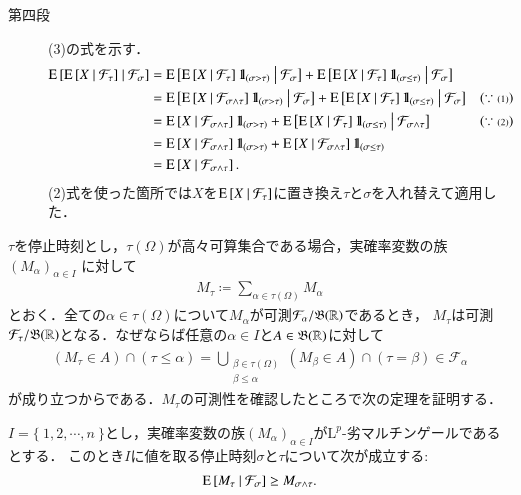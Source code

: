 \begin{prf}
\begin{description}
			\item[第四段]
				(3)の式を示す．
				\begin{align}
					\operatorname{E} \left[ \operatorname{E} \left[ X \ \middle|\ \mathcal{F}_\tau \right] \ \middle|\ \mathcal{F}_\sigma \right]
					&= \operatorname{E} \left[ \operatorname{E} \left[ X \ \middle|\ \mathcal{F}_\tau \right]\mbox{1}\hspace{-0.25em}\mbox{l}_{(\sigma > \tau)} \ \middle|\ \mathcal{F}_\sigma \right]
						+ \operatorname{E} \left[ \operatorname{E} \left[ X \ \middle|\ \mathcal{F}_\tau \right]\mbox{1}\hspace{-0.25em}\mbox{l}_{(\sigma \leq \tau)} \ \middle|\ \mathcal{F}_\sigma \right] \\
					&= \operatorname{E} \left[ \operatorname{E} \left[ X \ \middle|\ \mathcal{F}_{\sigma \wedge \tau} \right]\mbox{1}\hspace{-0.25em}\mbox{l}_{(\sigma > \tau)} \ \middle|\ \mathcal{F}_\sigma \right]
						+ \operatorname{E} \left[ \operatorname{E} \left[ X \ \middle|\ \mathcal{F}_\tau \right]\mbox{1}\hspace{-0.25em}\mbox{l}_{(\sigma \leq \tau)} \ \middle|\ \mathcal{F}_\sigma \right] && (\scriptsize\because\mbox{(1)}) \\
					&= \operatorname{E} \left[ X \ \middle|\ \mathcal{F}_{\sigma \wedge \tau} \right]\mbox{1}\hspace{-0.25em}\mbox{l}_{(\sigma > \tau)}
						+ \operatorname{E} \left[ \operatorname{E} \left[ X \ \middle|\ \mathcal{F}_\tau \right]\mbox{1}\hspace{-0.25em}\mbox{l}_{(\sigma \leq \tau)} \ \middle|\ \mathcal{F}_{\sigma \wedge \tau} \right] && (\scriptsize\because\mbox{(2)}) \\
					&= \operatorname{E} \left[ X \ \middle|\ \mathcal{F}_{\sigma \wedge \tau} \right]\mbox{1}\hspace{-0.25em}\mbox{l}_{(\sigma > \tau)} + \operatorname{E} \left[ X \ \middle|\ \mathcal{F}_{\sigma \wedge \tau} \right]\mbox{1}\hspace{-0.25em}\mbox{l}_{(\sigma \leq \tau)} \\
					&= \operatorname{E} \left[ X \ \middle|\ \mathcal{F}_{\sigma \wedge \tau} \right].
				\end{align}
				(2)式を使った箇所では$X$を$\operatorname{E} \left[ X \ \middle|\ \mathcal{F}_\tau \right]$に置き換え$\tau$と$\sigma$を入れ替えて適用した．
		\end{description}
		\QED
	\end{prf}
	
	$\tau$を停止時刻とし，$\tau(\Omega)$が高々可算集合である場合，実確率変数の族$(M_\alpha)_{\alpha \in I}$
	に対して
	\begin{align}
		M_\tau \coloneqq \sum_{\alpha \in \tau(\Omega)}M_\alpha
	\end{align}
	とおく．全ての$\alpha \in \tau(\Omega)$について$M_\alpha$が可測$\mathcal{F}_\alpha/\mathfrak{B}(\mathbb{R})$であるとき，
	$M_\tau$は可測$\mathcal{F}_\tau/\mathfrak{B}(\mathbb{R})$となる．なぜならば任意の$\alpha \in I$と$A \in \mathfrak{B}(\mathbb{R})$に対して
	\begin{align}
		(M_\tau \in A) \cap (\tau \leq \alpha)
		= \bigcup_{\substack{\beta \in \tau(\Omega) \\ \beta \leq \alpha}}(M_\beta \in A) \cap (\tau = \beta) \in \mathcal{F}_\alpha 
	\end{align}
	が成り立つからである．$M_\tau$の可測性を確認したところで次の定理を証明する．
	
	\begin{itembox}[l]{}
		\begin{thm}[任意抽出定理(その1)]
			$I = \{\ 1,2,\cdots,n\ \}$とし，実確率変数の族$(M_\alpha)_{\alpha \in I}$が$\mathrm{L}^p$-劣マルチンゲールであるとする．
			このとき$I$に値を取る停止時刻$\sigma$と$\tau$について次が成立する:
			\begin{align}
				\operatorname{E} \left[ M_\tau \ \middle|\ \mathcal{F}_\sigma \right] \geq M_{\sigma \wedge \tau}.
			\end{align}
		\end{thm}
	\end{itembox}
	

